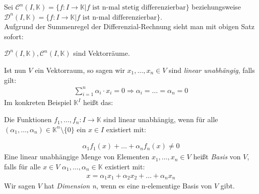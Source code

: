 \begin{Beispiel}{
	Sei $\mathcal{C}^n(I, \mathbb{K}) = \{ f: I \rightarrow \mathbb{K}
		\vert f \text{ ist n-mal stetig differenzierbar} \}$
	beziehungsweise
		$\mathcal{D}^n(I, \mathbb{K}) = \{ f: I \rightarrow \mathbb{K} \vert 
			f \text{ ist n-mal differenzierbar}\}$.\\
	Aufgrund der Summenregel der Differenzial-Rechnung sieht man mit obigen Satz 
	sofort: \begin{center}
	$\mathcal{D}^n(I, \mathbb{K}), \mathcal{C}^n(I, \mathbb{K})$ sind Vektorräume.
	\end{center}
	Ist nun $V$ ein Vektorraum, so sagen wir $x_1, \hdots, x_n \in V$ sind 
	\emph{linear unabhängig}, falls gilt:
	\begin{align*}
		\sum_{i=1}^n \alpha_i \cdot x_i = 0 \Rightarrow \alpha_i = \hdots = 
		\alpha_n = 0
	\end{align*}	 
	Im konkreten Beispiel $\mathbb{K}^I$ heißt das:
	\begin{center}
	Die Funktionen $f_1, \hdots, f_n: I \rightarrow \mathbb{K}$ sind linear 
	unabhängig, wenn für alle $(\alpha_1, \hdots, \alpha_n) \in \mathbb{K}^n
	\setminus \{0\}$ ein $x \in I$ existiert mit:
	\end{center}
	\begin{align*}
		\alpha_1f_1(x) + \hdots + \alpha_nf_n(x) \neq 0
	\end{align*}
	Eine linear unabhängige Menge von Elementen $x_1, \hdots, x_n \in V$
	heißt \emph{Basis} von $V$, falls für alle $x \in V$ $\alpha_1, \hdots, \alpha_n
	 \in \mathbb{K}$ existiert mit: 
	\begin{align*}	 
	 x = \alpha_1 x_1 + \alpha_2x_2 + \hdots  + \alpha_n x_n
	\end{align*}
	  Wir sagen $V$ hat \emph{Dimension n}, wenn es eine 
	 n-elementige Basis von $V$ gibt.
}\end{Beispiel}

